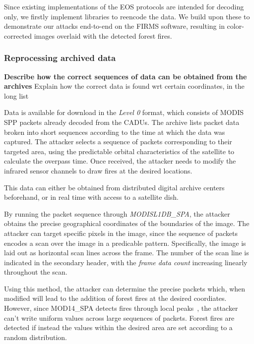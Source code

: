 Since existing implementations of the EOS protocols are intended for decoding only, we firstly implement libraries to reencode the data.
We build upon these to demonstrate our attacks end-to-end on the FIRMS software, resulting in color-corrected images overlaid with the detected forest fires.




\subsubsection{Reprocessing archived data}

\textbf{Describe how the correct sequences of data can be obtained from the archives}
Explain how the correct data is found wrt certain coordinates, in the long list

Data is available for download in the \textit{Level 0} format, which consists of MODIS SPP packets already decoded from the CADUs.
The archive lists packet data broken into short sequences according to the time at which the data was captured.
The attacker selects a sequence of packets corresponding to their targeted area, using the predictable orbital characteristics of the satellite to calculate the overpass time.
Once received, the attacker needs to modify the infrared sensor channels to draw fires at the desired locations.

This data can either be obtained from distributed digital archive centers~\cite{ladsweb} beforehand, or in real time with access to a satellite dish.

By running the packet sequence through \textit{MODISL1DB\_SPA}, the attacker obtains the precise geographical coordinates of the boundaries of the image.
The attacker can target specific pixels in the image, since the sequence of packets encodes a scan over the image in a predicable pattern.
Specifically, the image is laid out as horizontal scan lines across the frame.
The number of the scan line is indicated in the secondary header, with the \textit{frame data count} increasing linearly throughout the scan.

Using this method, the attacker can determine the precise packets which, when modified will lead to the addition of forest fires at the desired coordiates.
However, since MOD14\_SPA detects fires through local peaks~\cite{mod14Manual}, the attacker can't write uniform values across large sequences of packets.
Forest fires are detected if instead the values within the desired area are set according to a random distribution.

